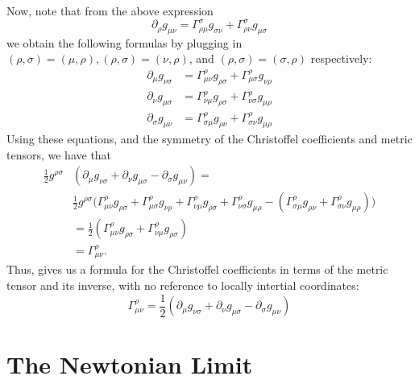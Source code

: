 \documentclass[12pt]{article}
\theoremstyle{definition}
\theoremstyle{remark}
\begin{document}
Now, note that from the above expression 
\[
\partial_{ \rho } g_{ \mu \nu } = \Gamma_{ \rho \mu }^{ \sigma } g_{ \sigma \nu } + \Gamma_{ \rho \nu }^{ \sigma } g_{ \mu \sigma } 
\]
we obtain the following formulas by plugging in $(\rho, \sigma) = (\mu, \rho), (\rho, \sigma) = (\nu, \rho)$, and $(\rho, \sigma) = (\sigma, \rho)$ respectively:
\begin{align*}
\partial_{\mu} g_{ \nu \sigma } 
&= 
\Gamma^{\rho}_{ \mu \nu } g_{ \rho \sigma } 
+
\Gamma^{ \rho}_{ \mu \sigma } g_{ \nu \rho } 
\\
\partial_{ \nu } g_{ \mu \sigma } 
&=
\Gamma^{ \rho }_{ \nu \mu } g_{ \rho \sigma } 
+
\Gamma^{ \rho }_{ \nu \sigma } g_{ \mu \rho } 
\\
\partial_{ \sigma } g_{ \mu \nu } 
&=
\Gamma^{ \rho }_{ \sigma \mu } g_{\rho \nu } 
+
\Gamma^{ \rho }_{ \sigma \nu } g_{ \mu \rho } 
\end{align*}
Using these equations, and the symmetry of the Christoffel coefficients and metric tensors, we have that 
\begin{align*}
\frac{1}{2} g^{ \rho \sigma } &\left( \partial_{ \mu } g_{ \nu \sigma } + \partial_{ \nu } g_{ \mu \sigma } - \partial_{ \sigma } g_{ \mu \nu } \right) = \\
& \frac{ 1}{2} g^{ \rho \sigma } \Big( \Gamma^{\rho}_{ \mu \nu } g_{ \rho \sigma } 
+
\Gamma^{ \rho}_{ \mu \sigma } g_{ \nu \rho } 
+ 
\Gamma^{ \rho }_{ \nu \mu } g_{ \rho \sigma } 
+
\Gamma^{ \rho }_{ \nu \sigma } g_{ \mu \rho } 
-
\left( \Gamma^{ \rho }_{ \sigma \mu } g_{\rho \nu } 
+
\Gamma^{ \rho }_{ \sigma \nu } g_{ \mu \rho } 
\right) \Big) \\
&= \frac{1}{2} \left( \Gamma^{ \rho }_{ \mu \nu } g_{ \rho \sigma } + \Gamma^{ \rho }_{ \nu \mu } g_{ \rho \sigma } \right)  \\
&=  \Gamma^{ \rho }_{ \mu \nu }.
\end{align*}
Thus, gives us a formula for the Christoffel coefficients in terms of the metric tensor and its inverse, with no reference to locally intertial coordinates:
\[
\Gamma_{ \mu \nu }^{ \rho } = \frac{1}{2} \left( \partial_{ \mu } g_{ \nu \sigma } + \partial_{ \nu } g_{ \mu \sigma } - \partial_{ \sigma } g_{ \mu \nu } \right) 
\]






\section{The Newtonian Limit}
\end{document}

